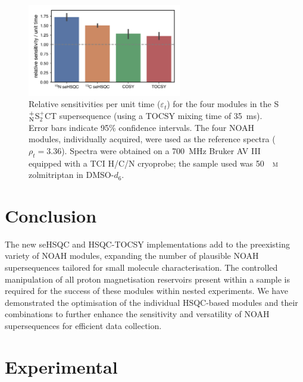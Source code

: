 \documentclass[final,twocolumn]{elsarticle}
\newcommand*{\noahC}{C}
\newcommand*{\noahSpb}{S$^+_2$}
\newcommand*{\noahSpn}{S$\rm ^+_N$}
\newcommand*{\noahT}{T}
\begin{document}
\begin{figure}[!ht]
    \centering
    \includegraphics[width=0.6\textwidth]{snr_modules.png}
    \caption{
        Relative sensitivities per unit time ($\varepsilon_t$) for the four modules in the \noahSpn{}\noahSpb{}\noahC{}\noahT{} supersequence (using a TOCSY mixing time of \SI{35}{\ms}).
        Error bars indicate 95\% confidence intervals.
        The four NOAH modules, individually acquired, were used as the reference spectra ($\rho_t = 3.36$).
        Spectra were obtained on a \SI{700}{\MHz} Bruker AV III equipped with a TCI H/C/N cryoprobe; the sample used was \SI{50}{\milli\textsc{m}} zolmitriptan in DMSO-$d_6$.
    }
    \label{fig:snr_modules}
\end{figure}

\section{Conclusion}

The new seHSQC and HSQC-TOCSY implementations add to the preexisting variety of NOAH modules, expanding the number of plausible NOAH supersequences tailored for small molecule characterisation.
The controlled manipulation of all proton magnetisation reservoirs present within a sample is required for the success of these modules within nested experiments.
We have demonstrated the optimisation of the individual HSQC-based modules and their combinations to further enhance the sensitivity and versatility of NOAH supersequences for efficient data collection.

\section*{Experimental}
\end{document}
